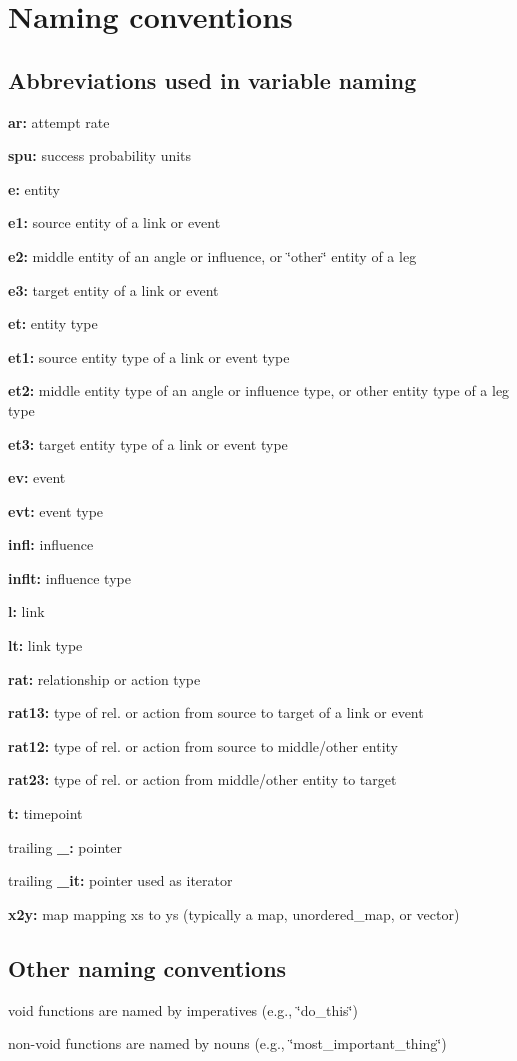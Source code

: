 \section*{Naming conventions }

\subsection*{Abbreviations used in variable naming }


\begin{DoxyItemize}
\item {\bfseries ar\+:} attempt rate
\item {\bfseries spu\+:} success probability units
\item {\bfseries e\+:} entity
\item {\bfseries e1\+:} source entity of a link or event
\item {\bfseries e2\+:} middle entity of an angle or influence, or \char`\"{}other\char`\"{} entity of a leg
\item {\bfseries e3\+:} target entity of a link or event
\item {\bfseries et\+:} entity type
\item {\bfseries et1\+:} source entity type of a link or event type
\item {\bfseries et2\+:} middle entity type of an angle or influence type, or other entity type of a leg type
\item {\bfseries et3\+:} target entity type of a link or event type
\item {\bfseries ev\+:} event
\item {\bfseries evt\+:} event type
\item {\bfseries infl\+:} influence
\item {\bfseries inflt\+:} influence type
\item {\bfseries l\+:} link
\item {\bfseries lt\+:} link type
\item {\bfseries rat\+:} relationship or action type
\item {\bfseries rat13\+:} type of rel. or action from source to target of a link or event
\item {\bfseries rat12\+:} type of rel. or action from source to middle/other entity
\item {\bfseries rat23\+:} type of rel. or action from middle/other entity to target
\item {\bfseries t\+:} timepoint
\item trailing {\bfseries \+\_\+\+:} pointer
\item trailing {\bfseries \+\_\+it\+:} pointer used as iterator
\item {\bfseries x2y\+:} map mapping xs to ys (typically a map, unordered\+\_\+map, or vector)
\end{DoxyItemize}

\subsection*{Other naming conventions }


\begin{DoxyItemize}
\item void functions are named by imperatives (e.\+g., \char`\"{}do\+\_\+this\char`\"{})
\item non-\/void functions are named by nouns (e.\+g., \char`\"{}most\+\_\+important\+\_\+thing\char`\"{}) 
\end{DoxyItemize}